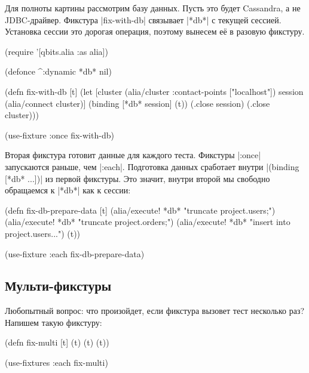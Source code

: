 
Для полноты картины рассмотрим базу данных. Пусть это будет Cassandra, а не
JDBC-драйвер. Фикстура \spverb|fix-with-db| связывает \spverb|*db*| с текущей
сессией. Установка сессии это дорогая операция, поэтому вынесем е\"{е} в разовую
фикстуру.

\begin{english}
  \begin{clojure}
(require '[qbits.alia :as alia])

(defonce ^:dynamic *db* nil)

(defn fix-with-db [t]
  (let [cluster (alia/cluster {:contact-points ["localhost"]})
        session (alia/connect cluster)]
    (binding [*db* session]
      (t))
    (.close session)
    (.close cluster)))

(use-fixture :once fix-with-db)
  \end{clojure}
\end{english}

Вторая фикстура готовит данные для каждого теста. Фикстуры \spverb|:once|
запускаются раньше, чем \spverb|:each|. Подготовка данных сработает внутри
\spverb|(binding [*db* ...])| из первой фикстуры. Это значит, внутри второй мы
свободно обращаемся к \spverb|*db*| как к сессии:


\begin{english}
  \begin{clojure}
(defn fix-db-prepare-data [t]
  (alia/execute! *db* "truncate project.users;")
  (alia/execute! *db* "truncate project.orders;")
  (alia/execute! *db* "insert into project.users...")
  (t))

(use-fixture :each fix-db-prepare-data)
  \end{clojure}
\end{english}

\subsection{Мульти-фикстуры}


Любопытный вопрос: что произойдет, если фикстура вызовет тест несколько раз?
Напишем такую фикстуру:

\begin{english}
  \begin{clojure}
(defn fix-multi [t]
  (t) (t) (t))

(use-fixtures :each fix-multi)
  \end{clojure}
\end{english}

